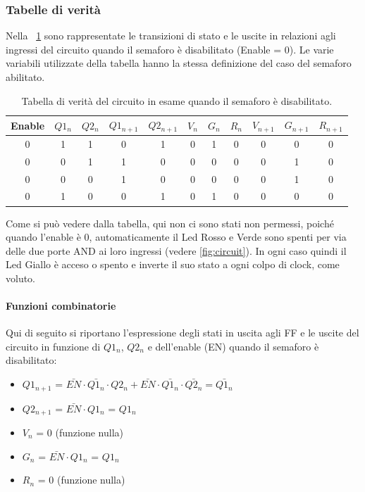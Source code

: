 \documentclass[a4paper,10pt]{article}
\begin{document}
\subsubsection{Tabelle di verità}

Nella \tablename{~\ref{tab:lampe}} sono rappresentate le transizioni di stato e le uscite in relazioni agli ingressi del circuito quando il semaforo è disabilitato (Enable = 0). Le varie variabili utilizzate della tabella hanno la stessa definizione del caso del semaforo abilitato.
 
 \begin{table}[H]
	\centering
	\begin{tabular}{c|cc|cc|ccc|ccc}
	\hline
	Enable & $Q1_n$ & $Q2_n$ & $Q1_{n+1}$ & $Q2_{n+1}$ & $V_n$ & $G_n$ & $R_n$ & $V_{n+1}$ & $G_{n+1}$ & $R_{n+1}$ \\
	\hline
	0 & 1 & 1 & 0 & 1 & 0 & 1 & 0 & 0 & 0 & 0 \\
	0 & 0 & 1 & 1 & 0 & 0 & 0 & 0 & 0 & 1 & 0 \\
	0 & 0 & 0 & 1 & 0 & 0 & 0 & 0 & 0 & 1 & 0 \\
	0 & 1 & 0 & 0 & 1 & 0 & 1 & 0 & 0 & 0 & 0 \\
	\hline
		\end{tabular}
	\caption{Tabella di verità del circuito in esame quando il semaforo è disabilitato.}
	\label{tab:lampe}
\end{table}

Come si può vedere dalla tabella, qui non ci sono stati non permessi, poiché quando l'enable è 0, automaticamente il Led Rosso e Verde sono spenti per via delle due porte AND ai loro ingressi (vedere \cref{fig:circuit}). In ogni caso quindi il Led Giallo è acceso o spento e inverte il suo stato a ogni colpo di clock, come voluto.

\paragraph{Funzioni combinatorie}
Qui di seguito si riportano l'espressione degli stati in uscita agli FF e le uscite del circuito in funzione di $Q1_n$, $Q2_n$ e dell'enable (EN) quando il semaforo è disabilitato:
\begin{itemize}
\item $Q1_{n+1}$ = $\bar{EN} \cdot \bar{Q1_n} \cdot Q2_n + \bar{EN} \cdot \bar{Q1_n} \cdot \bar{Q2_n} = \bar{Q1_n}$
\item $Q2_{n+1}$ = $\bar{EN} \cdot Q1_n$ = $Q1_n$
\item $V_{n}$ = 0 (funzione nulla)
\item $G_{n}$ = $\bar{EN} \cdot Q1_n$ = $Q1_n$
\item $R_{n}$ = 0 (funzione nulla)
\end{itemize}
\end{document}
